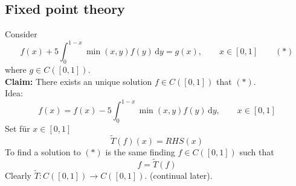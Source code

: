 
\subsection{Fixed point theory} 
\label{sub:fixed_point_theory}
\begin{beispiel}
	Consider
	\[
		f(x)+ 5 \int_{0}^{1-x} \min(x,y)f(y) \,\mathrm{d}y = g(x), \qquad x \in [0,1] \qquad (*)
	\]
	where $g \in C([0,1])$. \\ 
	\textbf{Claim:} \text{    }     There exists an unique solution $f \in C([0,1])$ that $(*)$. \\
	Idea:
	\[
		f(x) = f(x) - 5 \int_{0}^{1-x} \min(x,y)f(y) \,\mathrm{d}y, \qquad x \in [0,1]
	\]
	Set für $x \in [0,1]$ 
	\[
			\tilde T(f)(x) = RHS(x)
	\]
	To find a solution to $(*)$ is the same finding $f \in C([0,1])$ such that 
	\[
		f = \tilde T(f)
	\]
	Clearly $ \tilde T : C([0,1]) \to C([0,1])$. (continual later).
\end{beispiel}

